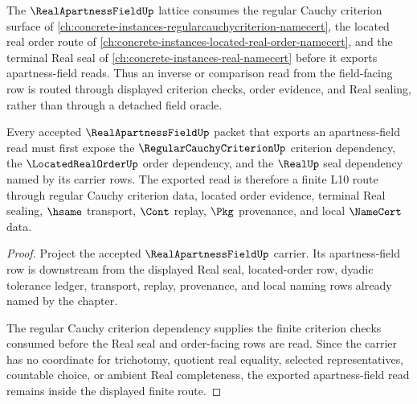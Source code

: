 The $\RealApartnessFieldUp$ lattice consumes the regular Cauchy criterion surface of \autoref{ch:concrete-instances-regularcauchycriterion-namecert}, the located real order route of \autoref{ch:concrete-instances-located-real-order-namecert}, and the terminal Real seal of \autoref{ch:concrete-instances-real-namecert} before it exports apartness-field reads. Thus an inverse or comparison read from the field-facing row is routed through displayed criterion checks, order evidence, and Real sealing, rather than through a detached field oracle.

\begin{proposition}
\label{thm:real-apartness-field-regular-cauchy-criterion-forward-route}
Every accepted $\RealApartnessFieldUp$ packet that exports an apartness-field read must first expose the $\RegularCauchyCriterionUp$ criterion dependency, the $\LocatedRealOrderUp$ order dependency, and the $\RealUp$ seal dependency named by its carrier rows. The exported read is therefore a finite L10 route through regular Cauchy criterion data, located order evidence, terminal Real sealing, $\hsame$ transport, $\Cont$ replay, $\Pkg$ provenance, and local $\NameCert$ data.
\end{proposition}
\begin{proof}
Project the accepted $\RealApartnessFieldUp$ carrier. Its apartness-field row is downstream from the displayed Real seal, located-order row, dyadic tolerance ledger, transport, replay, provenance, and local naming rows already named by the chapter.

The regular Cauchy criterion dependency supplies the finite criterion checks consumed before the Real seal and order-facing rows are read. Since the carrier has no coordinate for trichotomy, quotient real equality, selected representatives, countable choice, or ambient Real completeness, the exported apartness-field read remains inside the displayed finite route.
\end{proof}
